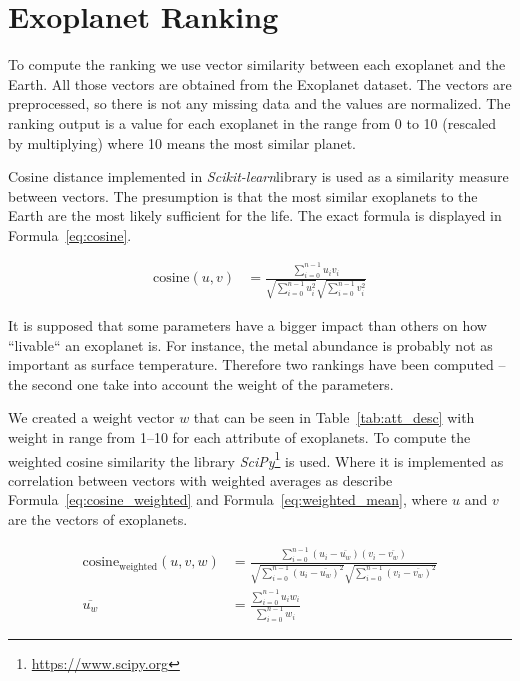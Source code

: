 \documentclass[12p]{article}
\begin{document}

\section{Exoplanet Ranking}
To compute the ranking we use vector similarity between each exoplanet and the Earth. All those vectors are obtained from the Exoplanet dataset. The vectors are preprocessed, so there is not any missing data and the values are normalized. The ranking output is a value for each exoplanet in the range from 0 to 10 (rescaled by multiplying) where 10 means the most similar planet.

Cosine distance implemented in \textit{Scikit-learn}\footnotemark[\value{footnote}] library is used as a similarity measure between vectors. The presumption is that the most similar exoplanets to the Earth are the most likely sufficient for the life. The exact formula is displayed in Formula~\ref{eq:cosine}.

\begin{align}
    \text{cosine}(u,v) &= \frac{\sum_{i=0}^{n-1} u_iv_i  }{ \sqrt{\sum_{i=0}^{n-1} u_i^2  } \sqrt{\sum_{i=0}^{n-1} v_i^2  }} \label{eq:cosine}
\end{align}

It is supposed that some parameters have a bigger impact than others on how ``livable`` an exoplanet is. For instance, the metal abundance is probably not as important as surface temperature. Therefore two rankings have been computed -- the second one take into account the weight of the parameters.

We created a weight vector $w$ that can be seen in Table~\ref{tab:att_desc} with weight in range from 1--10 for each attribute of exoplanets. To compute the weighted cosine similarity the library \textit{SciPy}\footnote{\url{https://www.scipy.org}} is used. Where it is implemented as correlation between vectors with weighted averages as describe Formula~\ref{eq:cosine_weighted} and Formula~\ref{eq:weighted_mean}, where $u$ and $v$ are the vectors of exoplanets.

\begin{align}
\text{cosine}_{\text{weighted}}(u,v,w) &= \frac{\sum_{i=0}^{n-1} (u_i-\overline{u_w})(v_i-\overline{v_w})  }{ \sqrt{\sum_{i=0}^{n-1} (u_i-\overline{u_w})^2  } \sqrt{\sum_{i=0}^{n-1} (v_i-\overline{v_w})^2  }} \label{eq:cosine_weighted} \\
\overline{u_w} &= \frac{ \sum_{i=0}^{n-1} u_iw_i }{ \sum_{i=0}^{n-1} w_i } \label{eq:weighted_mean}
\end{align}
\end{document}
